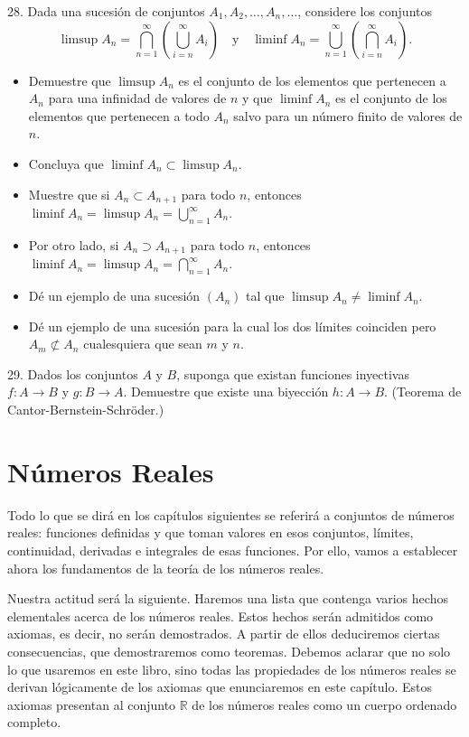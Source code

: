 \documentclass[12pt,oneside]{book}
\begin{document}
28. Dada una sucesión de conjuntos \( A_1, A_2, \dots, A_n, \dots \), considere los conjuntos  
\[
\limsup A_n = \bigcap_{n=1}^{\infty} \left( \bigcup_{i=n}^{\infty} A_i \right) \quad \text{y} \quad \liminf A_n = \bigcup_{n=1}^{\infty} \left( \bigcap_{i=n}^{\infty} A_i \right).
\]
\begin{itemize}
    \item[a)] Demuestre que \(\limsup A_n\) es el conjunto de los elementos que pertenecen a \(A_n\) para una infinidad de valores de \(n\) y que \(\liminf A_n\) es el conjunto de los elementos que pertenecen a todo \(A_n\) salvo para un número finito de valores de \(n\).
    \item[b)] Concluya que \(\liminf A_n \subset \limsup A_n\).
    \item[c)] Muestre que si \(A_n \subset A_{n+1}\) para todo \(n\), entonces \(\liminf A_n = \limsup A_n = \bigcup_{n=1}^{\infty} A_n\).
    \item[d)] Por otro lado, si \(A_n \supset A_{n+1}\) para todo \(n\), entonces \(\liminf A_n = \limsup A_n = \bigcap_{n=1}^{\infty} A_n\).
    \item[e)] Dé un ejemplo de una sucesión \((A_n)\) tal que \(\limsup A_n \neq \liminf A_n\).
    \item[f)] Dé un ejemplo de una sucesión para la cual los dos límites coinciden pero \(A_m \not\subset A_n\) cualesquiera que sean \(m\) y \(n\).
\end{itemize}

29. Dados los conjuntos \(A\) y \(B\), suponga que existan funciones inyectivas \(f: A \to B\) y \(g: B \to A\). Demuestre que existe una biyección \(h: A \to B\). (Teorema de Cantor-Bernstein-Schröder.)

\newpage

\chapter{Números Reales}

Todo lo que se dirá en los capítulos siguientes se referirá a conjuntos de números reales: funciones definidas y que toman valores en esos conjuntos, límites, continuidad, derivadas e integrales de esas funciones. Por ello, vamos a establecer ahora los fundamentos de la teoría de los números reales.

Nuestra actitud será la siguiente. Haremos una lista que contenga varios hechos elementales acerca de los números reales. Estos hechos serán admitidos como axiomas, es decir, no serán demostrados. A partir de ellos deduciremos ciertas consecuencias, que demostraremos como teoremas. Debemos aclarar que no solo lo que usaremos en este libro, sino todas las propiedades de los números reales se derivan lógicamente de los axiomas que enunciaremos en este capítulo. Estos axiomas presentan al conjunto \(\mathbb{R}\) de los números reales como un cuerpo ordenado completo.
\end{document}
